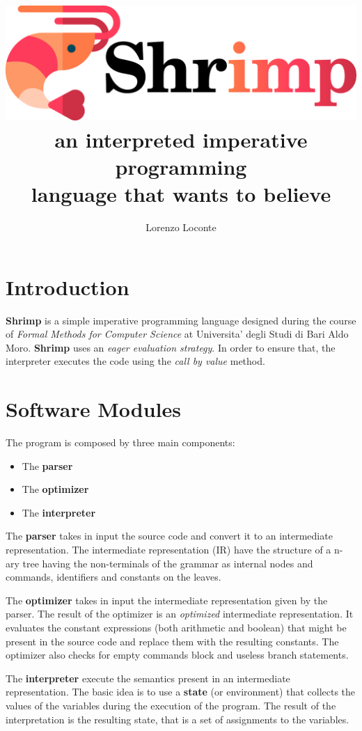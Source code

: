 \documentclass[12pt,a4paper]{article}
\date{}
\title{
    \includegraphics[width=0.67\linewidth]{logo.pdf} \\
    an interpreted imperative programming \\ language that wants to believe
}
\author{Lorenzo Loconte}
\begin{document}
\maketitle

\section*{Introduction}
\textbf{Shrimp} is a simple imperative programming language designed during the course of \textit{Formal Methods for Computer Science} at Universita' degli Studi di Bari Aldo Moro.
\textbf{Shrimp} uses an \textit{eager evaluation strategy}.
In order to ensure that, the interpreter executes the code using the \textit{call by value} method.

\section*{Software Modules}
The program is composed by three main components:
\begin{itemize}
    \item The \textbf{parser}
    \item The \textbf{optimizer}
    \item The \textbf{interpreter}
\end{itemize}

The \textbf{parser} takes in input the source code and convert it to an intermediate representation.
The intermediate representation (IR) have the structure of a n-ary tree having the non-terminals of the grammar as internal nodes and commands, identifiers and constants on the leaves.

The \textbf{optimizer} takes in input the intermediate representation given by the parser.
The result of the optimizer is an \textit{optimized} intermediate representation.
It evaluates the constant expressions (both arithmetic and boolean) that might be present in the source code and replace them with the resulting constants.
The optimizer also checks for empty commands block and useless branch statements.

The \textbf{interpreter} execute the semantics present in an intermediate representation.
The basic idea is to use a \textbf{state} (or environment) that collects the values of the variables during the execution of the program.
The result of the interpretation is the resulting state, that is a set of assignments to the variables.
\end{document}

